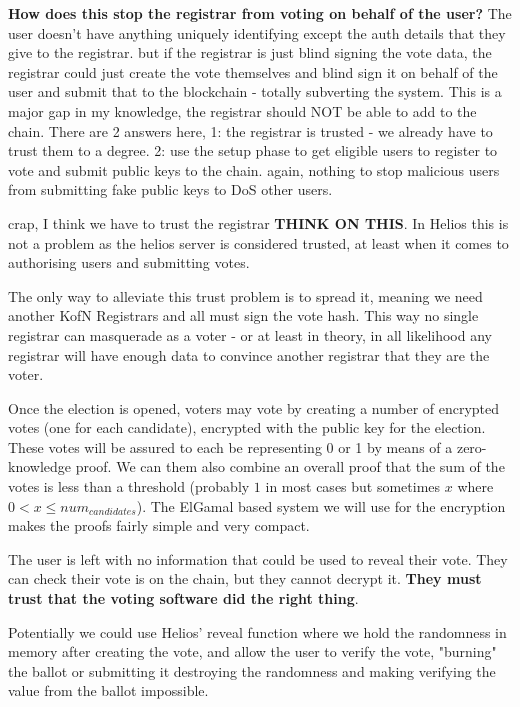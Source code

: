 {    \textbf{How does this stop the registrar from voting on behalf of the user?} The user doesn't have anything uniquely identifying except the auth details that they give to the registrar. but if the registrar is just blind signing the vote data, the registrar could just create the vote themselves and blind sign it on behalf of the user and submit that to the blockchain - totally subverting the system. This is a major gap in my knowledge, the registrar should NOT be able to add to the chain. There are 2 answers here, 1: the registrar is trusted - we already have to trust them to a degree. 2: use the setup phase to get eligible users to register to vote and submit public keys to the chain. again, nothing to stop malicious users from submitting fake public keys to DoS other users.

    crap, I think we have to trust the registrar \textbf{THINK ON THIS}. In Helios this is not a problem as the helios server is considered trusted, at least when it comes to authorising users and submitting votes.

    The only way to alleviate this trust problem is to spread it, meaning we need another KofN Registrars and all must sign the vote hash. This way no single registrar can masquerade as a voter - or at least in theory, in all likelihood any registrar will have enough data to convince another registrar that they are the voter.

    Once the election is opened, voters may vote by creating a number of encrypted votes (one for each candidate), encrypted with the public key for the election. These votes will be assured to each be representing 0 or 1 by means of a zero-knowledge proof. We can them also combine an overall proof that the sum of the votes is less than a threshold (probably $1$ in most cases but sometimes $x$ where $0 < x \le num_{candidates}$). The ElGamal based system we will use for the encryption makes the proofs fairly simple and very compact.

    The user is left with no information that could be used to reveal their vote. They can check their vote is on the chain, but they cannot decrypt it. \textbf{They must trust that the voting software did the right thing}.

    Potentially we could use Helios' reveal function where we hold the randomness in memory after creating the vote, and allow the user to verify the vote, "burning" the ballot or submitting it destroying the randomness and making verifying the value from the ballot impossible.

}
